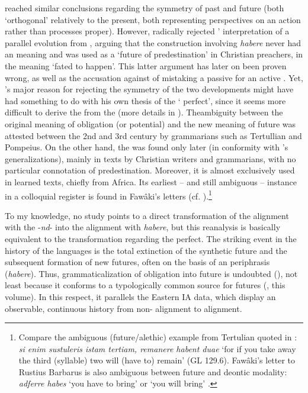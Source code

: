 \documentclass[output=paper]{langsci/langscibook}
\begin{document}
\citet{Benveniste1966[1965]} reached similar conclusions regarding the symmetry of past and future (both ‘orthogonal’ relatively to the present, both representing perspectives on an action rather than processes proper). However, \citet[131]{Benveniste1966[1965]} radically rejected \citeauthor{Kuryłowicz1965}’ interpretation of a parallel evolution from , arguing that the  construction involving \textit{habere} never had an  meaning and was used as a ‘future of predestination’ in Christian preachers, in the meaning ‘fated to happen’. This latter argument has later on been proven wrong, as well as the accusation against \citeauthor{Kuryłowicz1965} of mistaking a passive  for an active .  Yet, \citeauthor{Benveniste1966[1965]}’s major reason for rejecting the symmetry of the two developments might have had something to do with his own thesis of the ‘ perfect’, since it seems more difficult to derive the  from the  (more details in \citealt{Montaut1997}).
  The\largerpage ambiguity between the original meaning of obligation (or potential) and the new meaning of future was attested between the 2nd and 3rd century by grammarians such as Tertullian and Pompeius. On the other hand, the  was found only later (in conformity with \citet{BybeeEtAl1994}’s generalizations), mainly in texts by Christian writers and grammarians, with no particular connotation of predestination. Moreover, it is almost exclusively used in learned texts, chiefly from Africa. Its earliest – and still ambiguous – instance in a colloquial register is found in  Fawâki’s letters (cf. \citealt[659]{Adams2011,Adams2013}).\footnote{Compare the ambiguous (future/alethic) example from Tertulian quoted in \citet[148]{Adams2011}: \textit{si enim sustuleris istam tertiam, remanere habent duae} ‘for if you take away the third (syllable) two will (have to) remain’ (GL 129.6).  Fawâki’s letter to Rustius Barbarus is also ambiguous between future and deontic modality: \textit{adferre habes} ‘you have to bring’ or ‘you will bring’ \citep[659]{Adams2013}.} 

To my knowledge, no study points to a direct transformation of the   alignment with the -\textit{nd}{}-  into the  alignment with \textit{habere}, but this reanalysis is basically equivalent to the transformation regarding the perfect. The striking event in the history of the  languages is the total extinction of the  synthetic future and the subsequent formation of new futures, often on the basis of an  periphrasis (\textit{habere}). Thus, grammaticalization of obligation into future is undoubted (\citealt{Adams2011,Bourova2007}), not least because it conforms to a typologically common source for futures (\citeauthor{Heine2002}, this volume). In this respect, it parallels the Eastern IA data, which display an observable, continuous history from non- alignment to  alignment.
\end{document}
